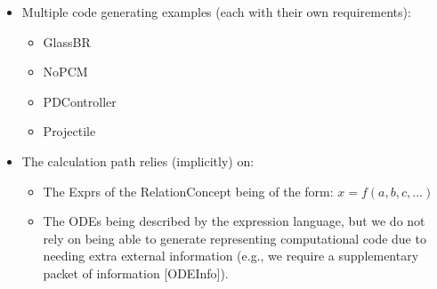 \begin{itemize}
    \item Multiple code generating examples (each with their own requirements):
          \begin{itemize}
              \item GlassBR
              \item NoPCM
              \item PDController
              \item Projectile
          \end{itemize}

    \item The calculation path relies (implicitly) on:
          \begin{itemize}

              \item The Exprs of the RelationConcept being of the form: $x =
                        f(a,b,c,...)$

              \item The ODEs being described by the expression language, but we
                    do not rely on being able to generate representing
                    computational code due to needing extra external information
                    (e.g., we require a supplementary packet of information
                        [ODEInfo]).

          \end{itemize}

\end{itemize}




